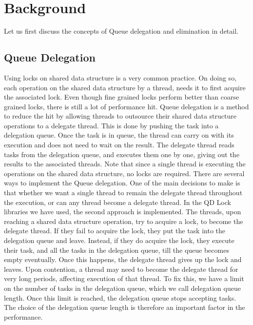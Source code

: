 \section{Background}
Let us first discuss the concepts of Queue delegation and elimination in detail.
\subsection{Queue Delegation}
Using locks on shared data structure is a very common practice. On doing so, each operation on the shared data structure by a thread, needs it to first acquire the associated lock. Even though fine grained locks perform better than coarse grained locks, there is still a lot of performance hit. Queue delegation is a method to reduce the hit by allowing threads to outsource their shared data structure operations to a delegate thread. This is done by pushing the task into a delegation queue. Once the task is in queue, the thread can carry on with its execution and does not need to wait on the result.
The delegate thread reads tasks from the delegation queue, and executes them one by one, giving out the results to the associated threads. Note that since a single thread is executing the operations on the shared data structure, no locks are required.
There are several ways to implement the Queue delegation. One of the main decisions to make is that whether we want a single thread to remain the delegate thread throughout the execution, or can any thread become a delegate thread. In the QD Lock libraries we have used, the second approach is implemented. The threads, upon reaching a shared data structure operation, try to acquire a lock, to become the delegate thread. If they fail to acquire the lock, they put the task into the delegation queue and leave. Instead, if they do acquire the lock, they execute their task, and all the tasks in the delegation queue, till the queue becomes empty eventually. Once this happens, the delegate thread gives up the lock and leaves. Upon contention, a thread may need to become the delegate thread for very long periods, affecting execution of that thread. To fix this, we have a limit on the number of tasks in the delegation queue, which we call delegation queue length. Once this limit is reached, the delegation queue stops accepting tasks. The choice of the delegation queue length is therefore an important factor in the performance.

